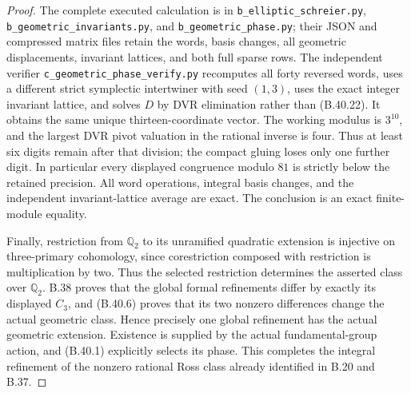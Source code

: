 \begin{proof}
The complete executed calculation is in
\texttt{b\_\allowbreak elliptic\_\allowbreak schreier.py},
\texttt{b\_\allowbreak geometric\_\allowbreak invariants.py}, and
\texttt{b\_\allowbreak geometric\_\allowbreak phase.py}; their JSON and compressed
matrix files retain the words, basis changes, all
geometric displacements, invariant lattices, and both
full sparse rows.
The independent verifier
\texttt{c\_\allowbreak geometric\_\allowbreak phase\_\allowbreak verify.py}
recomputes all forty reversed words, uses a different
strict symplectic intertwiner with seed $(1,3)$,
uses the exact integer invariant lattice, and solves
$D$ by DVR elimination rather than (B.40.22).
It obtains the same unique thirteen-coordinate vector.
The working modulus is $3^{10}$, and the largest
DVR pivot valuation in the rational inverse is four.
Thus at least six digits remain after that division;
the compact gluing loses only one further digit.
In particular every displayed congruence modulo $81$
is strictly below the retained precision. All word
operations, integral basis changes, and the independent
invariant-lattice average are exact. The conclusion
is an exact finite-module equality.

Finally, restriction from $\mathbb Q_2$ to its unramified
quadratic extension is injective on three-primary
cohomology, since corestriction composed with restriction
is multiplication by two. Thus the selected restriction
determines the asserted class over $\mathbb Q_2$.
B.38 proves that the global formal refinements differ
by exactly its displayed $C_3$, and (B.40.6) proves
that its two nonzero differences change the actual
geometric class. Hence precisely one global refinement
has the actual geometric extension.
Existence is supplied by the actual fundamental-group
action, and (B.40.1) explicitly selects its phase.
This completes the integral refinement of the
nonzero rational Ross class already identified in
B.20 and B.37.
\end{proof}
